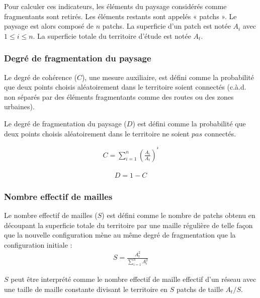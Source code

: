 \documentclass[11pt]{article}
\begin{document}
Pour calculer ces indicateurs, les éléments du paysage considérés comme fragmentants sont retirés. Les éléments restants sont appelés « patchs ». Le paysage est alors composé de $n$ patchs. La superficie d'un patch est notée  $A_i$ avec $1 \leq i \leq n$. La superficie totale du territoire d'étude est notée $A_t$.

\subsubsection{Degré de fragmentation du paysage}

Le degré de cohérence ($C$), une mesure auxiliaire, est défini comme la probabilité que deux points choisis aléatoirement dans le territoire soient connectés (c.à.d. non séparés par des éléments fragmentants comme des routes ou des zones urbaines).

Le degré de fragmentation du paysage ($D$) est défini comme la probabilité que deux points choisis aléatoirement dans le territoire ne soient $pas$ connectés.

\hspace*{-0.5cm}
\begin{minipage}[c][1cm]{.46\linewidth}
\begin{align*}
C = \sum_{i=1}^{n}(\frac{A_{i}}{A_{t}})^{²}
\end{align*}
\end{minipage}
\begin{minipage}[c][1cm]{.46\linewidth}
\begin{align*}
D = 1 - C
\end{align*}
\end{minipage}

\subsubsection{Nombre effectif de mailles}

Le nombre effectif de mailles ($S$) est défini comme le nombre de patchs obtenu en découpant la superficie totale du territoire par une maille régulière de telle façon que la nouvelle configuration mène au même degré de fragmentation que la configuration initiale :
\begin{align*}
S = \frac{A_{t}^{2}}{\sum_{i=1}^{n}A_{i}^{2}}
\end{align*}

$S$ peut être interprété comme le nombre effectif de maille effectif d'un réseau avec une taille de maille constante divisant le territoire en $S$ patchs de taille $A_{t} / S$.
\end{document}
